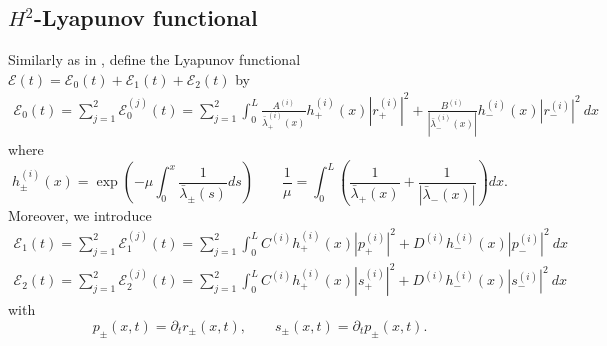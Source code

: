 \documentclass[12pt]{article}
\numberwithin{equation}{section}
\begin{document}
\subsection{$H^2$-Lyapunov functional}
Similarly as in \cite{MR2996527}, 
define the Lyapunov functional $\mathcal{E}(t)=\mathcal{E}_0(t)+\mathcal{E}_1(t)+\mathcal{E}_2(t)$ by 
\begin{align*}
    \mathcal{E}_0(t) = \sum_{j=1}^2\mathcal{E}_0^{(j)}(t)= \sum_{j=1}^2 \int_0^L\frac{A^{(i)}}{\bar{\lambda}^{(i)}_+(x)}h^{(i)}_+(x) |r_+^{(i)}|^2 + \frac{B^{(i)}}{|\bar{\lambda}^{(i)}_-(x)|}h^{(i)}_-(x) |r_-^{(i)}|^2~dx
\end{align*}
where 
$$
h^{(i)}_\pm(x) = \exp\left(-\mu \int_0^x\frac{1}{\bar{\lambda}_\pm(s)}ds\right)\qquad
\frac{1}{\mu} = \int_0^L\left(\frac{1}{\bar{\lambda}_+(x)}+\frac{1}{|\bar{\lambda}_-(x)|} \right)dx.
$$
Moreover, we introduce
\begin{align*}
    \mathcal{E}_1(t) = \sum_{j=1}^2\mathcal{E}_1^{(j)}(t)= \sum_{j=1}^2 \int_0^L C^{(i)}h^{(i)}_+(x) |p_+^{(i)}|^2 +  D^{(i)} h^{(i)}_-(x) |p_-^{(i)}|^2~dx\\[1mm]
    \mathcal{E}_2(t) = \sum_{j=1}^2\mathcal{E}_2^{(j)}(t)= \sum_{j=1}^2 \int_0^L C^{(i)}h^{(i)}_+(x) |s_+^{(i)}|^2 +  D^{(i)} h^{(i)}_-(x) |s_-^{(i)}|^2~dx
\end{align*}
with $$p_{\pm}(x,t)=\partial_tr_{\pm}(x,t),\qquad s_{\pm}(x,t)=\partial_tp_{\pm}(x,t).$$ 
\end{document}
